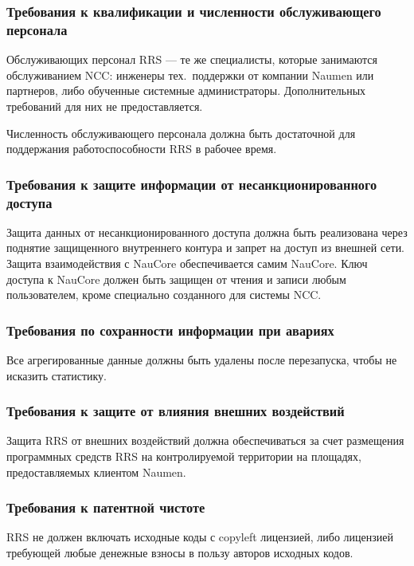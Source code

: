 \subsubsection{Требования к квалификации и численности обслуживающего персонала}

Обслуживающих персонал RRS --- те же специалисты, которые занимаются обслуживанием NCC:
инженеры тех.~поддержки от компании Naumen или партнеров,
либо обученные системные администраторы.
Дополнительных требований для них не предоставляется.

Численность обслуживающего персонала должна быть достаточной для поддержания работоспособности RRS в рабочее время.

\subsubsection{Требования к защите информации от несанкционированного доступа}

Защита данных от несанкционированного доступа должна быть реализована через поднятие защищенного внутреннего контура и запрет на доступ из внешней сети.
Защита взаимодействия с NauCore обеспечивается самим NauCore.
Ключ доступа к NauCore должен быть защищен от чтения и записи любым пользователем, кроме специально созданного для системы NCC.

\subsubsection{Требования по сохранности информации при авариях}

Все агрегированные данные должны быть удалены после перезапуска, чтобы не исказить статистику.

\subsubsection{Требования к защите от влияния внешних воздействий}

Защита RRS от внешних воздействий должна обеспечиваться за счет размещения программных средств RRS на контролируемой территории на площадях, предоставляемых клиентом Naumen.

\subsubsection{Требования к патентной чистоте}

RRS не должен включать исходные коды с copyleft лицензией, либо лицензией требующей любые денежные взносы в пользу авторов исходных кодов.

